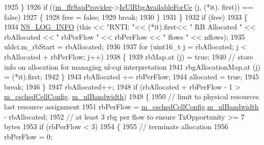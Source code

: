 \begin{DoxyCode}
1925                 \}
1926               \textcolor{keywordflow}{if} ((\hyperlink{classns3_1_1FdTbfqFfMacScheduler_a15bcdfbb46c65cae0d42e26b321f7827}{m\_ffrSapProvider}->\hyperlink{classns3_1_1LteFfrSapProvider_a3ef80840549b8ea3d50d2cef8a9866e2}{IsUlRbgAvailableForUe} (j, (*it).
      first)) == \textcolor{keyword}{false})
1927                 \{
1928                   free = \textcolor{keyword}{false};
1929                   \textcolor{keywordflow}{break};
1930                 \}
1931             \}
1932           \textcolor{keywordflow}{if} (free)
1933             \{
1934               \hyperlink{group__logging_gafbd73ee2cf9f26b319f49086d8e860fb}{NS\_LOG\_INFO} (\textcolor{keyword}{this} << \textcolor{stringliteral}{"RNTI: "}<< (*it).first<< \textcolor{stringliteral}{" RB Allocated "} << rbAllocated << \textcolor{stringliteral}{"
       rbPerFlow "} << rbPerFlow << \textcolor{stringliteral}{" flows "} << nflows);
1935               uldci.m\_rbStart = rbAllocated;
1936 
1937               \textcolor{keywordflow}{for} (uint16\_t j = rbAllocated; j < rbAllocated + rbPerFlow; j++)
1938                 \{
1939                   rbMap.at (j) = \textcolor{keyword}{true};
1940                   \textcolor{comment}{// store info on allocation for managing ul-cqi interpretation}
1941                   rbgAllocationMap.at (j) = (*it).first;
1942                 \}
1943               rbAllocated += rbPerFlow;
1944               allocated = \textcolor{keyword}{true};
1945               \textcolor{keywordflow}{break};
1946             \}
1947           rbAllocated++;
1948           \textcolor{keywordflow}{if} (rbAllocated + rbPerFlow - 1 > \hyperlink{classns3_1_1FdTbfqFfMacScheduler_a73d5d866713fa06e1cc6186b0f556693}{m\_cschedCellConfig}.
      \hyperlink{structns3_1_1FfMacCschedSapProvider_1_1CschedCellConfigReqParameters_a5ab5b102878e6e7e7727a14af4a64d2f}{m\_ulBandwidth})
1949             \{
1950               \textcolor{comment}{// limit to physical resources last resource assignment}
1951               rbPerFlow = \hyperlink{classns3_1_1FdTbfqFfMacScheduler_a73d5d866713fa06e1cc6186b0f556693}{m\_cschedCellConfig}.\hyperlink{structns3_1_1FfMacCschedSapProvider_1_1CschedCellConfigReqParameters_a5ab5b102878e6e7e7727a14af4a64d2f}{m\_ulBandwidth} - rbAllocated;
1952               \textcolor{comment}{// at least 3 rbg per flow to ensure TxOpportunity >= 7 bytes}
1953               \textcolor{keywordflow}{if} (rbPerFlow < 3)
1954                 \{
1955                   \textcolor{comment}{// terminate allocation}
1956                   rbPerFlow = 0;                 

\end{DoxyCode}
